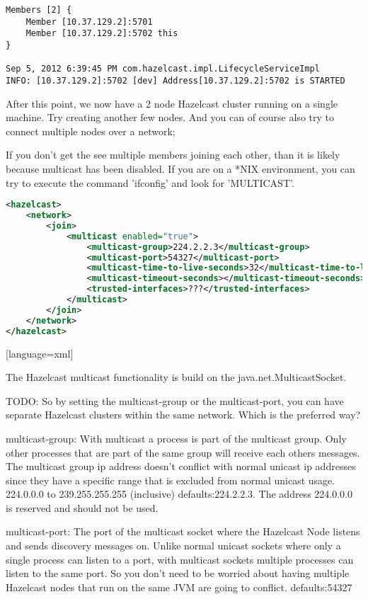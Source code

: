 \begin{verbatim}
Members [2] {
    Member [10.37.129.2]:5701
    Member [10.37.129.2]:5702 this
}

Sep 5, 2012 6:39:45 PM com.hazelcast.impl.LifecycleServiceImpl
INFO: [10.37.129.2]:5702 [dev] Address[10.37.129.2]:5702 is STARTED
\end{verbatim}		

After this point, we now have a 2 node Hazelcast cluster running on a single machine. Try creating another few nodes. And you can of course also try to connect multiple nodes over a network;

If you don't get the see multiple members joining each other, than it is likely because multicast has been disabled. If you are on a *NIX environment, you can try to execute the command 'ifconfig' and look for 'MULTICAST'. 

\begin{lstlisting}[language=xml]
<hazelcast>
    <network>
        <join>
            <multicast enabled="true">
                <multicast-group>224.2.2.3</multicast-group>
                <multicast-port>54327</multicast-port>
                <multicast-time-to-live-seconds>32</multicast-time-to-live-seconds>
                <multicast-timeout-seconds></multicast-timeout-seconds>
                <trusted-interfaces>???</trusted-interfaces>
            </multicast>
        </join>
    </network>
</hazelcast>
\end{lstlisting}[language=xml]

The Hazelcast multicast functionality is build on the java.net.MulticastSocket.

TODO: So by setting the multicast-group or the multicast-port, you can have separate Hazelcast clusters within the same network. Which is the preferred way?

multicast-group:
With multicast a process is part of the multicast group. Only other processes that are part of the same group will receive each others messages. The multicast group ip address doesn't conflict with normal unicast ip addresses since they have a specific range that is excluded from normal unicast usage. 224.0.0.0 to 239.255.255.255 (inclusive)
defaults:224.2.2.3. The address 224.0.0.0 is reserved and should not be used.

multicast-port: The port of the multicast socket where the Hazelcast Node listens and sends discovery messages on. Unlike normal unicast sockets where only a single process can listen to a port, with multicast sockets multiple processes can listen to the same port. So you don't need to be worried about having multiple Hazelcast nodes that run on the same JVM are going to conflict.
defaults:54327

